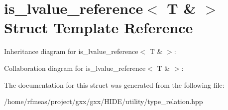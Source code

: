 \hypertarget{structis__lvalue__reference_3_01T_01_6_01_4}{}\section{is\+\_\+lvalue\+\_\+reference$<$ T \& $>$ Struct Template Reference}
\label{structis__lvalue__reference_3_01T_01_6_01_4}


Inheritance diagram for is\+\_\+lvalue\+\_\+reference$<$ T \& $>$\+:


Collaboration diagram for is\+\_\+lvalue\+\_\+reference$<$ T \& $>$\+:


The documentation for this struct was generated from the following file\+:\begin{DoxyCompactItemize}
\item 
/home/rfmeas/project/gxx/gxx/\+H\+I\+D\+E/utility/type\+\_\+relation.\+hpp\end{DoxyCompactItemize}
